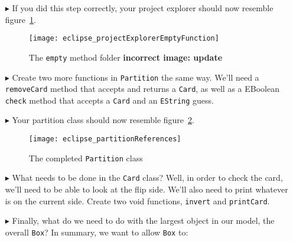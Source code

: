 \begin{itemize}
\item[$\blacktriangleright$] If you did this step correctly, your project explorer should now resemble figure~\ref{fig:emptyFolder}.

\begin{figure}[htbp]
	\centering
  \texttt{[image: eclipse\_projectExplorerEmptyFunction]}
	\caption{The \texttt{empty} method folder {\bf incorrect image: update}}
	\label{fig:emptyFolder}
\end{figure} 

\item[$\blacktriangleright$] Create two more functions in \texttt{Partition} the same way. We'll need a \texttt{removeCard} method that accepts and returns a \texttt{Card}, as well as a EBoolean \texttt{check} method that accepts a \texttt{Card} and an \texttt{EString} guess.

\item[$\blacktriangleright$] Your partition class should now resemble figure~\ref{fig:partitionComplete}.

\begin{figure}[htbp]
	\centering
  \texttt{[image: eclipse\_partitionReferences]}
	\caption{The completed \texttt{Partition} class}
	\label{fig:partitionComplete}
\end{figure}

\item[$\blacktriangleright$] What needs to be done in the \texttt{Card} class? Well, in order to check the card, we'll need to be able to look at the flip side. We'll also need to print whatever is on the current side. Create two void functions, \texttt{invert} and \texttt{printCard}.

\item[$\blacktriangleright$] Finally, what do we need to do with the largest object in our model, the overall \texttt{Box}? In summary, we want to allow \texttt{Box} to:




\end{itemize}
